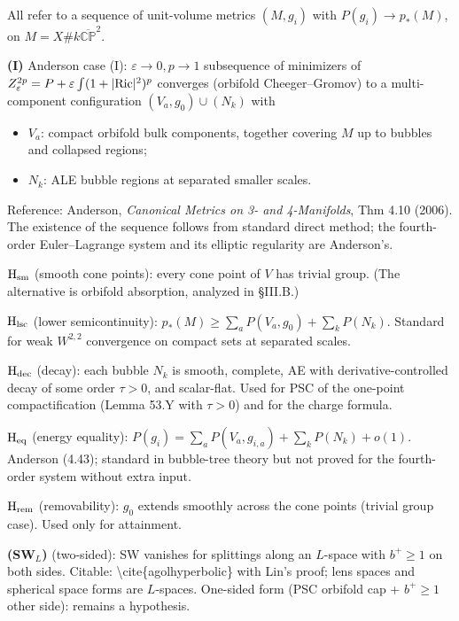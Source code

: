 \documentclass[
  10pt,
]{report}
\providecommand{\tightlist}{%
  \setlength{\itemsep}{0pt}\setlength{\parskip}{0pt}}
\begin{document}
All refer to a sequence of unit-volume metrics \((M,g_i)\) with
\(P(g_i)\to p_*(M)\), on \(M=X\#k\overline{\mathbb{CP}}^2\).

\textbf{(I)} Anderson case (I): \(\varepsilon\to0,p\to1\) subsequence of
minimizers of
\(Z^{2p}_\varepsilon=P+\varepsilon\int(1+|{\rm Ric}|^2)^p\) converges
(orbifold Cheeger--Gromov) to a multi-component configuration
\((V_a,g_0)\cup(N_k)\) with

\begin{itemize}
\tightlist
\item
  \(V_a\): compact orbifold bulk components, together covering \(M\) up
  to bubbles and collapsed regions;
\item
  \(N_k\): ALE bubble regions at separated smaller scales.
\end{itemize}

Reference: Anderson, \emph{Canonical Metrics on 3- and 4-Manifolds}, Thm
4.10 (2006). The existence of the sequence follows from standard direct
method; the fourth-order Euler--Lagrange system and its elliptic
regularity are Anderson's.

\textbf{\(\mathrm H_{\rm sm}\)} (smooth cone points): every cone point
of \(V\) has trivial group. (The alternative is orbifold absorption,
analyzed in §III.B.)

\textbf{\(\mathrm H_{\rm lsc}\)} (lower semicontinuity):
\(p_*(M)\ge\sum_aP(V_a,g_0)+\sum_kP(N_k)\). Standard for weak
\(W^{2,2}\) convergence on compact sets at separated scales.

\textbf{\(\mathrm H_{\rm dec}\)} (decay): each bubble \(N_k\) is smooth,
complete, AE with derivative-controlled decay of some order \(\tau>0\),
and scalar-flat. Used for PSC of the one-point compactification (Lemma
53.Y with \(\tau>0\)) and for the charge formula.

\textbf{\(\mathrm H_{\rm eq}\)} (energy equality):
\(P(g_i)=\sum_aP(V_a,g_{i,a})+\sum_kP(N_k)+o(1)\). Anderson (4.43);
standard in bubble-tree theory but not proved for the fourth-order
system without extra input.

\textbf{\(\mathrm H_{\rm rem}\)} (removability): \(g_0\) extends
smoothly across the cone points (trivial group case). Used only for
attainment.

\textbf{(SW\(_L\))} (two-sided): SW vanishes for splittings along an
\(L\)-space with \(b^+\ge1\) on both sides. Citable:
\textbackslash cite\{agolhyperbolic\} with Lin's proof; lens spaces and
spherical space forms are \(L\)-spaces. One-sided form (PSC orbifold cap
+ \(b^+\ge1\) other side): remains a hypothesis.
\end{document}
